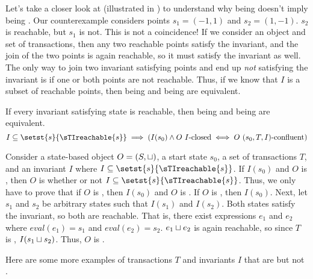 

Let's take a closer look at  (illustrated in
) to understand why being \sTIconfluent{}
doesn't imply being \Iclosed{}. Our counterexample considers points $s_1 = (-1,
1)$ and $s_2 = (1, -1)$. $s_2$ is reachable, but $s_1$ is not. This is not a
coincidence! If we consider an \sTIconfluent{} object and set of transactions,
then any two reachable points satisfy the invariant, and the join of the two
points is again reachable, so it must satisfy the invariant as well. The only
way to join two invariant satisfying points and end up \emph{not} satisfying
the invariant is if one or both points are not reachable. Thus, if we know that
$I$ is a subset of reachable points, then being \sTIconfluent{} and being
\Iclosed{} are equivalent.

\begin{claim}
  If every invariant satisfying state is reachable, then being \sTIconfluent{}
  and being \Iclosed{} are equivalent.
  \[
    I \subseteq \setst{s}{\sTIreachable{s}} \implies
    (I(s_0) \land \text{$O$ \Iclosed{}} \iff \text{$O$ \sTIconfluent})
  \]
\end{claim}
\begin{elidableproof}
  Consider a state-based object $O = (S, \sqcup)$, a start state $s_0$, a set of
  transactions $T$, and an invariant $I$ where $I \subseteq
  \setst{s}{\sTIreachable{s}}$.
  If $I(s_0)$ and $O$ is \Iclosed{}, then $O$ is \sTIconfluent{} whether or not
  $I \subseteq \setst{s}{\sTIreachable{s}}$. Thus, we only have to prove that
  if $O$ is \sTIconfluent{}, then $I(s_0)$ and $O$ is \Iclosed.
  If $O$ is \sTIconfluent{}, then $I(s_0)$. Next, let $s_1$ and $s_2$ be
  arbitrary states such that $I(s_1)$ and $I(s_2)$. Both states satisfy the
  invariant, so both are reachable. That is, there exist expressions $e_1$ and
  $e_2$ where $eval(e_1) = s_1$  and $eval(e_2) = s_2$. $e_1 \sqcup e_2$ is
  again reachable, so since $T$ is \sTIconfluent{}, $I(s_1 \sqcup s_2)$.  Thus,
  $O$ is \Iclosed.
\end{elidableproof}

Here are some more examples of transactions $T$ and invariants $I$ that are
\sTIconfluent{} but not \Iclosed{}.


